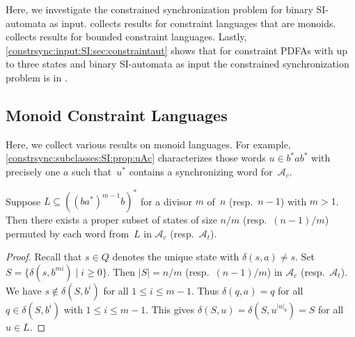 
Here, we investigate the constrained synchronization problem
for binary SI-automata as input.
 collects results
for constraint languages that are monoids.
 collects results
for bounded constraint languages.
Lastly, \cref{constrsync:input:SI:sec:constraintaut}
shows that for constraint PDFAs with up to three states
and binary SI-automata as input 
the constrained synchronization problem is in \NL.
 
\begin{center} 
\end{center}
\label{def:AtAc}

\subsection{Monoid Constraint Languages} 
\label{constrsync:input:SI:sec:monoid}

Here, we collect various results on monoid languages.
For example, \cref{constrsync:subclasses:SI:prop:uAc} characterizes those words $u \in b^*ab^*$ 
with precisely one $a$ such that~$u^*$ contains a synchronizing word for~$\mathcal A_c$.

\begin{proposition} \label{constrsync:subclasses:prop:SI:permutesset-new}
	Suppose $L \subseteq ( (ba^*)^{m - 1}b )^*$
	for a divisor $m$ of~$n$ (resp.~$n- 1$)
	with $m > 1$.
	Then there exists a proper subset of states of size $n / m$ (resp.~$(n-1)/m$)
	permuted by each word from~$L$ in $\mathcal A_c$ (resp.~$\mathcal A_t$).
\end{proposition}
\begin{proof}
	Recall that $s \in Q$ denotes the unique state with $\delta(s, a) \ne s$.
	Set $S = \{ \delta(s, b^{mi}) \mid i \ge 0 \}$.
	Then $|S| = n / m$ (resp.~$(n-1)/m$) in $\mathcal A_c$ (resp.~$\mathcal A_t$).
	We have $s \notin \delta(S, b^i)$ for all $1 \le i \le m - 1$.
	Thus $\delta(q, a) = q$ for all $q \in \delta(S, b^i)$ with $1 \le i \le m - 1$.
	This gives $\delta(S, u) = \delta(S, u^{|u|_b}) = S$
	for all $u \in L$.	
\end{proof}

